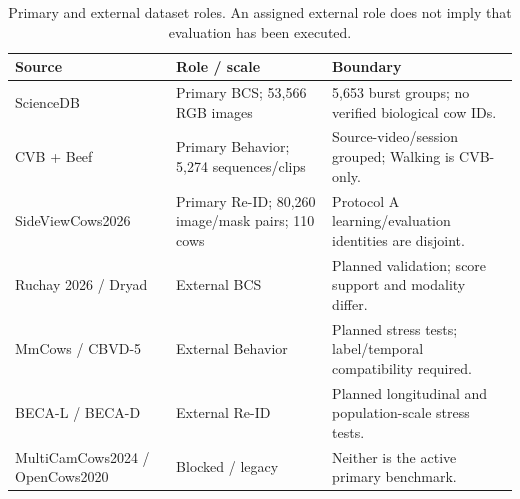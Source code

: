 \begin{table}[htbp]
\centering\small
\caption[Dataset roles and interpretation boundaries]{Primary and external dataset roles. An assigned external role does not imply that evaluation has been executed.}\label{tab:datasets}
\begin{tabularx}{\textwidth}{lYY}
\toprule
Source & Role / scale & Boundary \\
\midrule
ScienceDB & Primary BCS; 53,566 RGB images & 5,653 burst groups; no verified biological cow IDs. \\
CVB + Beef & Primary Behavior; 5,274 sequences/clips & Source-video/session grouped; Walking is CVB-only. \\
SideViewCows2026 & Primary Re-ID; 80,260 image/mask pairs; 110 cows & Protocol A learning/evaluation identities are disjoint. \\
Ruchay 2026 / Dryad & External BCS & Planned validation; score support and modality differ. \\
MmCows / CBVD-5 & External Behavior & Planned stress tests; label/temporal compatibility required. \\
BECA-L / BECA-D & External Re-ID & Planned longitudinal and population-scale stress tests. \\
MultiCamCows2024 / OpenCows2020 & Blocked / legacy & Neither is the active primary benchmark. \\
\bottomrule
\end{tabularx}
\end{table}
